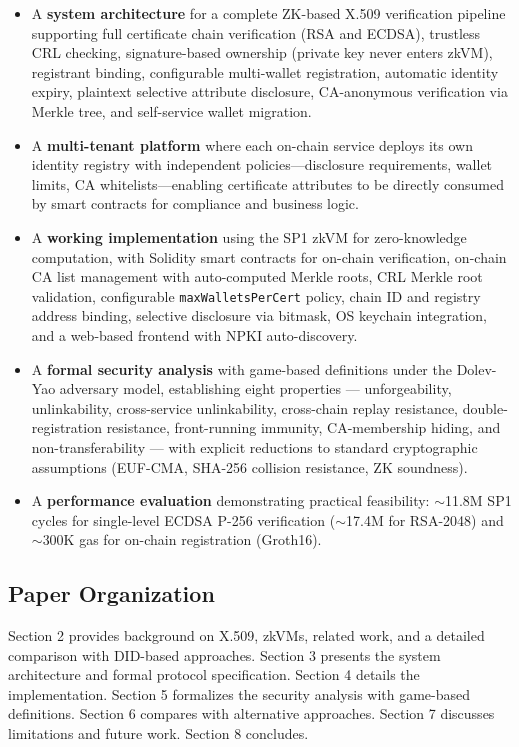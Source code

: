 \documentclass[11pt, a4paper]{article}
\providecommand{\tightlist}{%
  \setlength{\itemsep}{0pt}\setlength{\parskip}{0pt}}
\begin{document}
\begin{itemize}
\tightlist
\item
  A \textbf{system architecture} for a complete ZK-based X.509
  verification pipeline supporting full certificate chain verification
  (RSA and ECDSA), trustless CRL checking, signature-based ownership
  (private key never enters zkVM), registrant binding, configurable
  multi-wallet registration, automatic identity expiry, plaintext
  selective attribute disclosure, CA-anonymous verification via Merkle
  tree, and self-service wallet migration.
\item
  A \textbf{multi-tenant platform} where each on-chain service deploys
  its own identity registry with independent policies---disclosure
  requirements, wallet limits, CA whitelists---enabling certificate
  attributes to be directly consumed by smart contracts for compliance
  and business logic.
\item
  A \textbf{working implementation} using the SP1 zkVM for
  zero-knowledge computation, with Solidity smart contracts for on-chain
  verification, on-chain CA list management with auto-computed Merkle
  roots, CRL Merkle root validation, configurable
  \texttt{maxWalletsPerCert} policy, chain ID and registry address
  binding, selective disclosure via bitmask, OS keychain integration,
  and a web-based frontend with NPKI auto-discovery.
\item
  A \textbf{formal security analysis} with game-based definitions under
  the Dolev-Yao adversary model, establishing eight properties ---
  unforgeability, unlinkability, cross-service unlinkability, cross-chain replay resistance, double-registration resistance,
  front-running immunity, CA-membership hiding, and non-transferability --- with
  explicit reductions to standard cryptographic assumptions (EUF-CMA,
  SHA-256 collision resistance, ZK soundness).
\item
  A \textbf{performance evaluation} demonstrating practical feasibility:
  $\sim$11.8M SP1 cycles for single-level ECDSA P-256
  verification ($\sim$17.4M for RSA-2048) and
  $\sim$300K gas for on-chain registration (Groth16).
\end{itemize}

\subsection{Paper Organization}\label{paper-organization}

Section 2 provides background on X.509, zkVMs, related work, and a
detailed comparison with DID-based approaches. Section 3 presents the
system architecture and formal protocol specification. Section 4 details
the implementation. Section 5 formalizes the security analysis with
game-based definitions. Section 6 compares with alternative approaches.
Section 7 discusses limitations and future work. Section 8 concludes.
\end{document}

